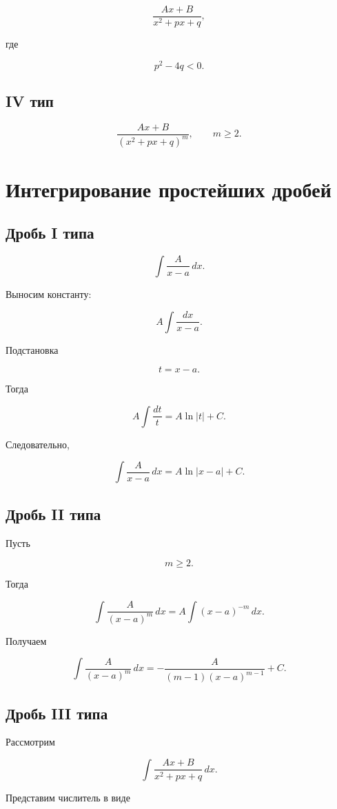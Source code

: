 \documentclass[14pt]{extreport}
\begin{document}
\[
\frac{Ax+B}{x^2+px+q},
\]

где

\[
p^2-4q<0.
\]

\subsection*{IV тип}

\[
\frac{Ax+B}{(x^2+px+q)^m},
\qquad
m\ge2.
\]

\section{Интегрирование простейших дробей}

\subsection{Дробь I типа}

\[
\int \frac{A}{x-a}\,dx.
\]

Выносим константу:

\[
A\int \frac{dx}{x-a}.
\]

Подстановка

\[
t=x-a.
\]

Тогда

\[
A\int \frac{dt}{t}
=
A\ln|t|+C.
\]

Следовательно,

\[
\boxed{
\int \frac{A}{x-a}\,dx
=
A\ln|x-a|+C.
}
\]

\subsection{Дробь II типа}

Пусть

\[
m\ge2.
\]

Тогда

\[
\int \frac{A}{(x-a)^m}\,dx
=
A\int (x-a)^{-m}\,dx.
\]

Получаем

\[
\boxed{
\int \frac{A}{(x-a)^m}\,dx
=
-\frac{A}{(m-1)(x-a)^{m-1}}
+C.
}
\]

\subsection{Дробь III типа}

Рассмотрим

\[
\int\frac{Ax+B}{x^2+px+q}\,dx.
\]

Представим числитель в виде
\end{document}
